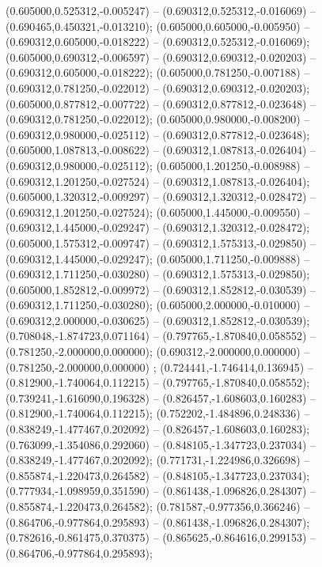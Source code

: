  (0.605000,0.525312,-0.005247) -- (0.690312,0.525312,-0.016069) -- (0.690465,0.450321,-0.013210);
 (0.605000,0.605000,-0.005950) -- (0.690312,0.605000,-0.018222) -- (0.690312,0.525312,-0.016069);
 (0.605000,0.690312,-0.006597) -- (0.690312,0.690312,-0.020203) -- (0.690312,0.605000,-0.018222);
 (0.605000,0.781250,-0.007188) -- (0.690312,0.781250,-0.022012) -- (0.690312,0.690312,-0.020203);
 (0.605000,0.877812,-0.007722) -- (0.690312,0.877812,-0.023648) -- (0.690312,0.781250,-0.022012);
 (0.605000,0.980000,-0.008200) -- (0.690312,0.980000,-0.025112) -- (0.690312,0.877812,-0.023648);
 (0.605000,1.087813,-0.008622) -- (0.690312,1.087813,-0.026404) -- (0.690312,0.980000,-0.025112);
 (0.605000,1.201250,-0.008988) -- (0.690312,1.201250,-0.027524) -- (0.690312,1.087813,-0.026404);
 (0.605000,1.320312,-0.009297) -- (0.690312,1.320312,-0.028472) -- (0.690312,1.201250,-0.027524);
 (0.605000,1.445000,-0.009550) -- (0.690312,1.445000,-0.029247) -- (0.690312,1.320312,-0.028472);
 (0.605000,1.575312,-0.009747) -- (0.690312,1.575313,-0.029850) -- (0.690312,1.445000,-0.029247);
 (0.605000,1.711250,-0.009888) -- (0.690312,1.711250,-0.030280) -- (0.690312,1.575313,-0.029850);
 (0.605000,1.852812,-0.009972) -- (0.690312,1.852812,-0.030539) -- (0.690312,1.711250,-0.030280);
 (0.605000,2.000000,-0.010000) -- (0.690312,2.000000,-0.030625) -- (0.690312,1.852812,-0.030539);
 (0.708048,-1.874723,0.071164) -- (0.797765,-1.870840,0.058552) -- (0.781250,-2.000000,0.000000);
 (0.690312,-2.000000,0.000000) -- (0.781250,-2.000000,0.000000) ;
 (0.724441,-1.746414,0.136945) -- (0.812900,-1.740064,0.112215) -- (0.797765,-1.870840,0.058552);
 (0.739241,-1.616090,0.196328) -- (0.826457,-1.608603,0.160283) -- (0.812900,-1.740064,0.112215);
 (0.752202,-1.484896,0.248336) -- (0.838249,-1.477467,0.202092) -- (0.826457,-1.608603,0.160283);
 (0.763099,-1.354086,0.292060) -- (0.848105,-1.347723,0.237034) -- (0.838249,-1.477467,0.202092);
 (0.771731,-1.224986,0.326698) -- (0.855874,-1.220473,0.264582) -- (0.848105,-1.347723,0.237034);
 (0.777934,-1.098959,0.351590) -- (0.861438,-1.096826,0.284307) -- (0.855874,-1.220473,0.264582);
 (0.781587,-0.977356,0.366246) -- (0.864706,-0.977864,0.295893) -- (0.861438,-1.096826,0.284307);
 (0.782616,-0.861475,0.370375) -- (0.865625,-0.864616,0.299153) -- (0.864706,-0.977864,0.295893);
